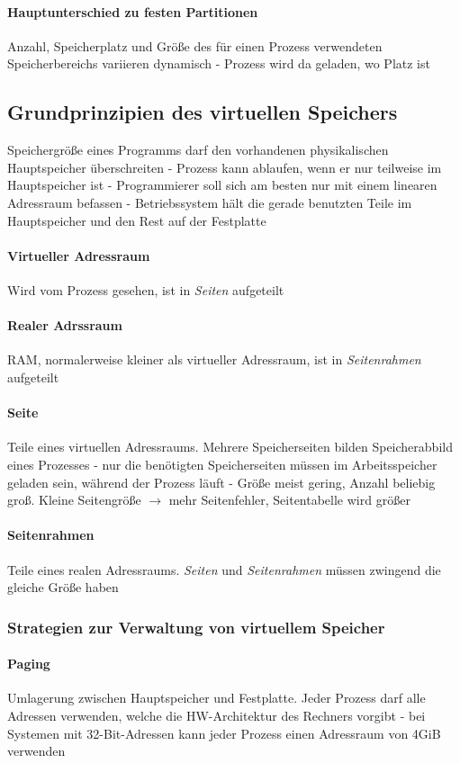 \documentclass[11pt,a4paper,landscape]{article}
\begin{document}
\begin{multicols*}{3}
	\paragraph{Hauptunterschied zu festen Partitionen} Anzahl, Speicherplatz und Größe des für einen Prozess verwendeten Speicherbereichs variieren dynamisch - Prozess wird da geladen, wo Platz ist
	\subsection{Grundprinzipien des virtuellen Speichers}
	Speichergröße eines Programms darf den vorhandenen physikalischen Hauptspeicher überschreiten - Prozess kann ablaufen, wenn er nur teilweise im Hauptspeicher ist - Programmierer soll sich am besten nur mit einem linearen Adressraum befassen - Betriebssystem hält die gerade benutzten Teile im Hauptspeicher und den Rest auf der Festplatte
	\paragraph{Virtueller Adressraum} Wird vom Prozess gesehen, ist in \textit{Seiten} aufgeteilt
	\paragraph{Realer Adrssraum} RAM, normalerweise kleiner als virtueller Adressraum, ist in \textit{Seitenrahmen} aufgeteilt
	\paragraph{Seite} Teile eines virtuellen Adressraums. Mehrere Speicherseiten bilden Speicherabbild eines Prozesses - nur die benötigten Speicherseiten müssen im Arbeitsspeicher geladen sein, während der Prozess läuft - Größe meist gering, Anzahl beliebig groß. Kleine Seitengröße $\rightarrow$ mehr Seitenfehler, Seitentabelle wird größer
	\paragraph{Seitenrahmen} Teile eines realen Adressraums. \textit{Seiten} und \textit{Seitenrahmen} müssen zwingend die gleiche Größe haben
	\subsubsection{Strategien zur Verwaltung von virtuellem Speicher}
	\paragraph{Paging} Umlagerung zwischen Hauptspeicher und Festplatte. Jeder Prozess darf alle Adressen verwenden, welche die HW-Architektur des Rechners vorgibt - bei Systemen mit 32-Bit-Adressen kann jeder Prozess einen Adressraum von 4GiB verwenden

\end{multicols*}
\end{document}

